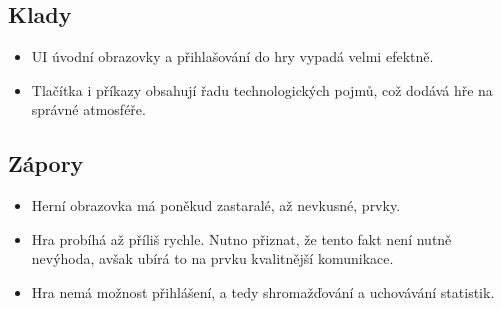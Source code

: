 \FloatBarrier

\subsection*{Klady}

\begin{itemize}
    \item UI úvodní obrazovky a přihlašování do hry vypadá velmi efektně.
    \item Tlačítka i příkazy obsahují řadu technologických pojmů,
což dodává hře na správné atmosféře.
\end{itemize}

\subsection*{Zápory}

\begin{itemize}
    \item Herní obrazovka má poněkud zastaralé, až nevkusné, prvky.
    \item Hra probíhá až příliš rychle.
Nutno přiznat, že tento fakt není nutně nevýhoda,
avšak ubírá to na prvku kvalitnější komunikace.
    \item Hra nemá možnost přihlášení,
a tedy shromažďování a uchovávání statistik.
\end{itemize}
